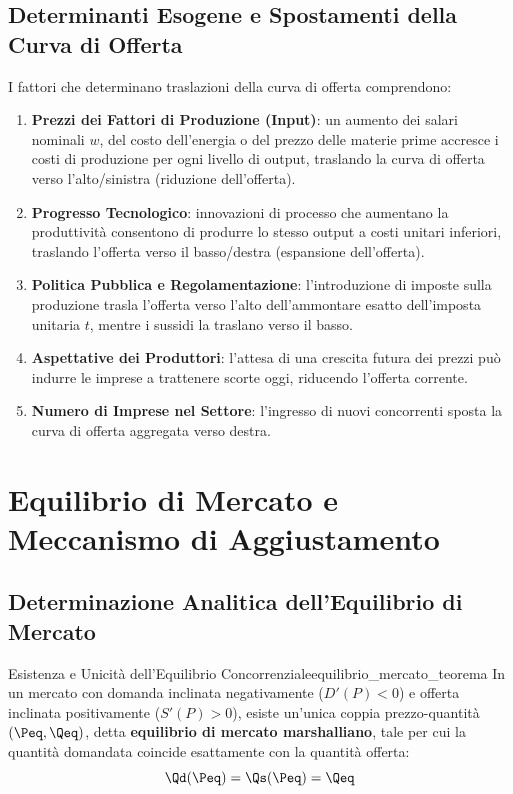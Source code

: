 \subsection{Determinanti Esogene e Spostamenti della Curva di Offerta}
I fattori che determinano traslazioni della curva di offerta comprendono:
\begin{enumerate}
    \item \textbf{Prezzi dei Fattori di Produzione (Input)}: un aumento dei salari nominali $w$, del costo dell'energia o del prezzo delle materie prime accresce i costi di produzione per ogni livello di output, traslando la curva di offerta verso l'alto/sinistra (riduzione dell'offerta).
    \item \textbf{Progresso Tecnologico}: innovazioni di processo che aumentano la produttività consentono di produrre lo stesso output a costi unitari inferiori, traslando l'offerta verso il basso/destra (espansione dell'offerta).
    \item \textbf{Politica Pubblica e Regolamentazione}: l'introduzione di imposte sulla produzione trasla l'offerta verso l'alto dell'ammontare esatto dell'imposta unitaria $t$, mentre i sussidi la traslano verso il basso.
    \item \textbf{Aspettative dei Produttori}: l'attesa di una crescita futura dei prezzi può indurre le imprese a trattenere scorte oggi, riducendo l'offerta corrente.
    \item \textbf{Numero di Imprese nel Settore}: l'ingresso di nuovi concorrenti sposta la curva di offerta aggregata verso destra.
\end{enumerate}

\section{Equilibrio di Mercato e Meccanismo di Aggiustamento}

\subsection{Determinazione Analitica dell'Equilibrio di Mercato}

\begin{teorema}{Esistenza e Unicità dell'Equilibrio Concorrenziale}{equilibrio_mercato_teorema}
In un mercato con domanda inclinata negativamente ($D'(P) < 0$) e offerta inclinata positivamente ($S'(P) > 0$), esiste un'unica coppia prezzo-quantità $(\Peq, \Qeq)$, detta \textbf{equilibrio di mercato marshalliano}, tale per cui la quantità domandata coincide esattamente con la quantità offerta:
\begin{equation}
    \Qd(\Peq) = \Qs(\Peq) = \Qeq
\end{equation}
\end{teorema}

